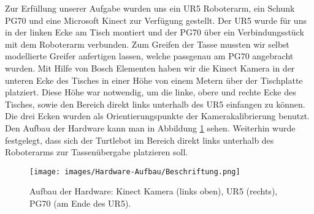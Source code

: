 Zur Erfüllung unserer Aufgabe wurden uns ein UR5 Roboterarm, ein Schunk PG70 und eine Microsoft Kinect zur Verfügung gestellt. Der UR5 wurde für uns in der linken Ecke am Tisch montiert und der PG70 über ein Verbindungsstück mit dem Roboterarm verbunden. Zum Greifen der Tasse mussten wir selbst modellierte Greifer anfertigen lassen, welche passgenau am PG70 angebracht wurden. Mit Hilfe von Bosch Elementen haben wir die Kinect Kamera in der unteren Ecke des Tisches in einer Höhe von einem Metern über der Tischplatte platziert. Diese Höhe war notwendig, um die linke, obere und rechte Ecke des Tisches, sowie den Bereich direkt links unterhalb des UR5 einfangen zu können. Die drei Ecken wurden als Orientierungspunkte der Kamerakalibrierung benutzt. Den Aufbau der Hardware kann man in Abbildung \ref{Hardware} sehen.
\newline
Weiterhin wurde festgelegt, dass sich der Turtlebot im Bereich direkt links unterhalb des Roboterarms zur Tassenübergabe platzieren soll.
\begin{figure}
	\centering
	\texttt{[image: images/Hardware-Aufbau/Beschriftung.png]}
	\caption{Aufbau der Hardware: Kinect Kamera (links oben), UR5 (rechts), PG70 (am Ende des UR5).}
	\label{Hardware}
\end{figure}
